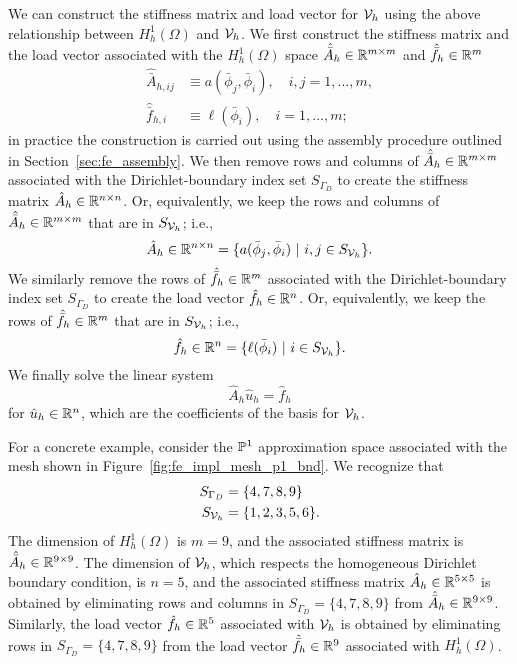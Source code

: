 We can construct the stiffness matrix and load vector for $\mathcal{V}_h$ using the above relationship between $H^1_h(\Omega)$ and $\mathcal{V}_h$.  We first construct the stiffness matrix and the load vector associated with the $H^1_h(\Omega)$ space $\hat{\bar{A}}_h \in \mathbb{R}^{m \times m}$ and $\hat{\bar{f}}_h \in \mathbb{R}^m$
\begin{align*}
  \hat{\bar{A}}_{h,ij} &\equiv a(\bar \phi_j,\bar \phi_i), \quad i,j = 1,\dots,m,\\
  \hat{\bar{f}}_{h,i} &\equiv \ell(\bar \phi_i), \quad i = 1,\dots,m;
\end{align*}
in practice the construction is carried out using the assembly procedure outlined in Section~\ref{sec:fe_assembly}. We then remove rows and columns of $\hat{\bar{A}}_{h} \in \mathbb{R}^{m \times m}$ associated with the Dirichlet-boundary index set $S_{\Gamma_D}$ to create the stiffness matrix $\hat A_h \in \mathbb{R}^{n \times n}$. Or, equivalently, we keep the rows and columns of $\hat{\bar A}_h \in \mathbb{R}^{m \times m}$ that are in $S_{\mathcal{V}_h}$; i.e.,
\begin{equation}
  \hat A_h \in \mathbb{R}^{n \times n} = \{ a(\bar \phi_j, \bar \phi_i) \ | \ i,j \in S_{\mathcal{V}_h} \}.
  \label{eq:fe_impl_hatAh_dir}
\end{equation}
We similarly remove the rows of $\hat{\bar{f}}_h \in \mathbb{R}^m$ associated with the Dirichlet-boundary index set $S_{\Gamma_D}$ to create the load vector $\hat f_h \in \mathbb{R}^n$. Or, equivalently, we keep the rows of $\hat{\bar f}_h \in \mathbb{R}^{m}$ that are in $S_{\mathcal{V}_h}$; i.e.,
\begin{equation}
  \hat f_h \in \RR^{n} = \{ \ell(\bar \phi_i) \ | \ i \in S_{\calV_h} \}.
  \label{eq:fe_impl_hatfh_dir}
\end{equation}
We finally solve the linear system
\begin{equation*}
  \hat A_h \hat u_h = \hat f_h
\end{equation*}
for $\hat u_h \in \mathbb{R}^n$, which are the coefficients of the basis for $\mathcal{V}_h$.

For a concrete example, consider the $\mathbb{P}^1$ approximation space associated with the mesh shown in Figure~\ref{fig:fe_impl_mesh_p1_bnd}. We recognize that
\begin{align*}
  S_{\Gamma_D} &= \{ 4,7,8,9 \} \\
  S_{\mathcal{V}_h} &= \{ 1,2,3,5,6\}.
\end{align*}
The dimension of $H^1_h(\Omega)$ is $m = 9$, and the associated stiffness matrix is $\hat{\bar A}_h \in \mathbb{R}^{9 \times 9}$.  The dimension of $\mathcal{V}_h$, which respects the homogeneous Dirichlet boundary condition, is $n = 5$, and the associated stiffness matrix $\hat A_h \in \mathbb{R}^{5 \times 5}$ is obtained by eliminating rows and columns in $S_{\Gamma_D} = \{4, 7, 8, 9\}$ from $\hat{\bar A}_h \in \mathbb{R}^{9 \times 9}$.  Similarly, the load vector $\hat f_h \in \mathbb{R}^5$ associated with $\mathcal{V}_h$ is obtained by eliminating rows in $S_{\Gamma_D} = \{4, 7, 8, 9\}$  from the load vector $\hat{\bar f}_h \in \mathbb{R}^9$ associated with $H^1_h(\Omega)$.

